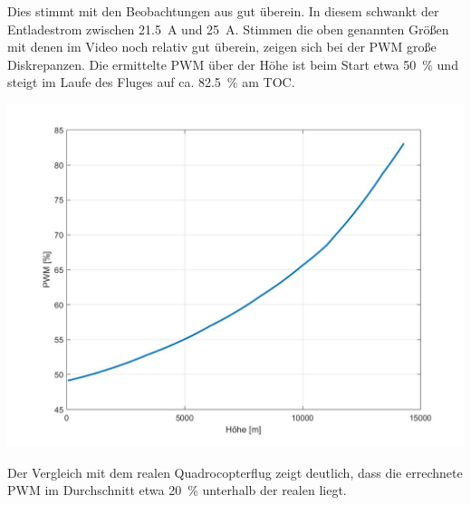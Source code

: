 Dies stimmt mit den Beobachtungen aus \cite{Anderson.2018} gut überein. In diesem schwankt der Entladestrom zwischen \SI{21,5}{A} und \SI{25}{A}.
Stimmen die oben genannten Größen mit denen im Video noch relativ gut überein, zeigen sich bei der PWM große Diskrepanzen. Die ermittelte PWM über der Höhe ist beim Start etwa \SI{50}{\%} und steigt im Laufe des Fluges auf ca. \SI{82,5}{\%} am TOC. 
\begin{center}
	\includegraphics[scale=0.3]{Diagramme/PWM.jpg}
	\label{pic:pwm_russland}
\end{center}
Der Vergleich mit dem realen Quadrocopterflug zeigt deutlich, dass die errechnete PWM im Durchschnitt etwa \SI{20}{\%} unterhalb der realen liegt.


